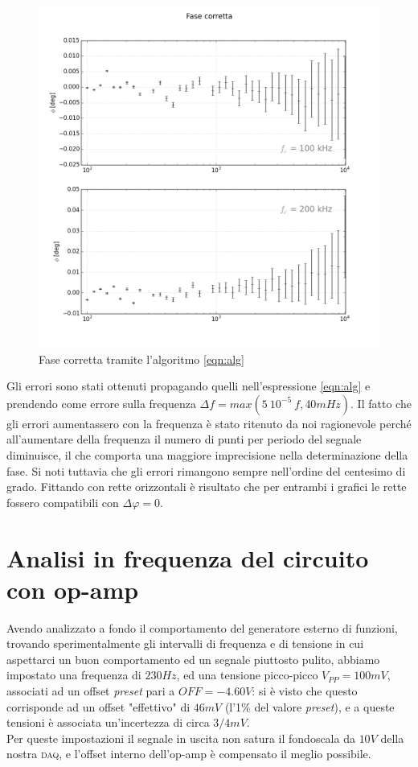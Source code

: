 \documentclass[journal, a4paper]{IEEEtran}
\begin{document}
\begin{figure}[htp]
\centering
\includegraphics[scale=.3]{subplots_errors}
\caption{Fase corretta tramite l'algoritmo \ref{eqn:alg}}
\label{fig:suberr}
\end{figure}

Gli errori sono stati ottenuti propagando quelli nell'espressione \ref{eqn:alg} e prendendo come errore sulla frequenza $\Delta f = max(5~10^{-5}~f, 40 mHz)$. Il fatto che gli errori aumentassero con la frequenza è stato ritenuto da noi ragionevole perché all'aumentare della frequenza il numero di punti per periodo del segnale diminuisce, il che comporta una maggiore imprecisione nella determinazione della fase. Si noti tuttavia che gli errori rimangono sempre nell'ordine del centesimo di grado. Fittando con rette orizzontali è risultato che per entrambi i grafici le rette fossero compatibili con $ \Delta \varphi =0$.

\section{Analisi in frequenza del circuito con op-amp}

Avendo analizzato a fondo il comportamento del generatore esterno di funzioni, trovando sperimentalmente gli intervalli di frequenza e di tensione in cui aspettarci un buon comportamento ed un segnale piuttosto pulito, abbiamo impostato una frequenza di $230 \si{Hz}$, ed una tensione picco-picco $V_{PP} = 100 \si{mV}$, associati ad un offset \textit{preset} pari a $OFF = -4.60 \si{V}$: si è visto che questo corrisponde ad un offset "effettivo" di $46 \si{mV}$ (l'1\% del valore \textit{preset}), e a queste tensioni è associata un'incertezza di circa $3/4 \si{mV} $. \\
Per queste impostazioni il segnale in uscita non satura il fondoscala da $10 \si{V}$ della nostra \textsc{daq}, e l'offset interno dell'op-amp è compensato il meglio possibile.\\
\end{document}
